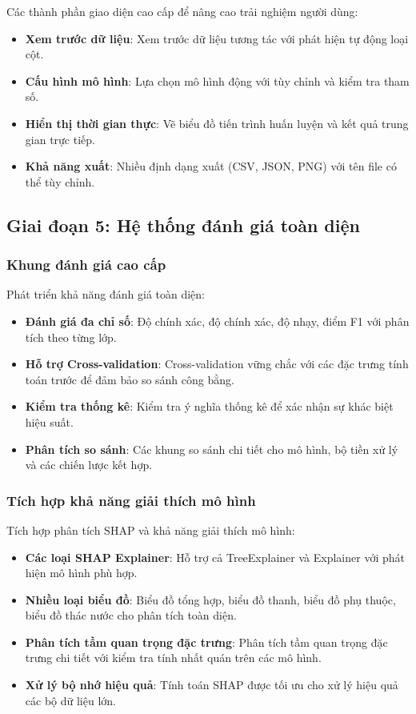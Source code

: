 Các thành phần giao diện cao cấp để nâng cao trải nghiệm người dùng:

\begin{itemize}
    \item \textbf{Xem trước dữ liệu}: Xem trước dữ liệu tương tác với phát hiện tự động loại cột.
    \item \textbf{Cấu hình mô hình}: Lựa chọn mô hình động với tùy chỉnh và kiểm tra tham số.
    \item \textbf{Hiển thị thời gian thực}: Vẽ biểu đồ tiến trình huấn luyện và kết quả trung gian trực tiếp.
    \item \textbf{Khả năng xuất}: Nhiều định dạng xuất (CSV, JSON, PNG) với tên file có thể tùy chỉnh.
\end{itemize}

\subsection{Giai đoạn 5: Hệ thống đánh giá toàn diện}\label{subsec:evaluation-stage}

\subsubsection{Khung đánh giá cao cấp}

Phát triển khả năng đánh giá toàn diện:

\begin{itemize}
    \item \textbf{Đánh giá đa chỉ số}: Độ chính xác, độ chính xác, độ nhạy, điểm F1 với phân tích theo từng lớp.
    \item \textbf{Hỗ trợ Cross-validation}: Cross-validation vững chắc với các đặc trưng tính toán trước để đảm bảo so sánh công bằng.
    \item \textbf{Kiểm tra thống kê}: Kiểm tra ý nghĩa thống kê để xác nhận sự khác biệt hiệu suất.
    \item \textbf{Phân tích so sánh}: Các khung so sánh chi tiết cho mô hình, bộ tiền xử lý và các chiến lược kết hợp.
\end{itemize}

\subsubsection{Tích hợp khả năng giải thích mô hình}

Tích hợp phân tích SHAP và khả năng giải thích mô hình:

\begin{itemize}
    \item \textbf{Các loại SHAP Explainer}: Hỗ trợ cả TreeExplainer và Explainer với phát hiện mô hình phù hợp.
    \item \textbf{Nhiều loại biểu đồ}: Biểu đồ tổng hợp, biểu đồ thanh, biểu đồ phụ thuộc, biểu đồ thác nước cho phân tích toàn diện.
    \item \textbf{Phân tích tầm quan trọng đặc trưng}: Phân tích tầm quan trọng đặc trưng chi tiết với kiểm tra tính nhất quán trên các mô hình.
    \item \textbf{Xử lý bộ nhớ hiệu quả}: Tính toán SHAP được tối ưu cho xử lý hiệu quả các bộ dữ liệu lớn.
\end{itemize}

